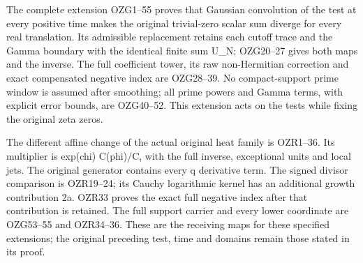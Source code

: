 \documentclass[
  10pt,
  a4paper,
]{article}
\begin{document}
The complete extension OZG1--55 proves that Gaussian convolution of the
test at every positive time makes the original trivial-zero scalar sum
diverge for every real translation. Its admissible replacement retains
each cutoff trace and the Gamma boundary with the identical finite sum
U\_N; OZG20--27 gives both maps and the inverse. The full coefficient
tower, its raw non-Hermitian correction and exact compensated negative
index are OZG28--39. No compact-support prime window is assumed after
smoothing; all prime powers and Gamma terms, with explicit error bounds,
are OZG40--52. This extension acts on the tests while fixing the
original zeta zeros.

The different affine change of the actual original heat family is
OZR1--36. Its multiplier is exp(chi) C(phi)/C, with the full inverse,
exceptional units and local jets. The original generator contains every
q derivative term. The signed divisor comparison is OZR19--24; its
Cauchy logarithmic kernel has an additional growth contribution 2a.
OZR33 proves the exact full negative index after that contribution is
retained. The full support carrier and every lower coordinate are
OZG53--55 and OZR34--36. These are the receiving maps for these
specified extensions; the original preceding test, time and domains
remain those stated in its proof.
\end{document}
